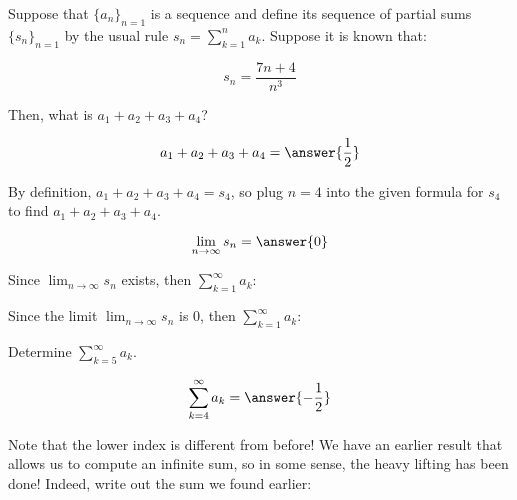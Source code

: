 \documentclass{ximera}
\author{Jim Talamo}
\begin{document}
\begin{exercise}
Suppose that $\{a_n\}_{n=1}$ is a sequence and define its sequence of partial sums $\{s_n\}_{n=1}$ by the usual rule $s_n = \sum_{k=1}^n a_k$.  Suppose it is known that:

\[
s_n = \frac{7n+4}{n^3}
\]

Then, what is $a_1+a_2+a_3+a_4$?

\[
a_1+a_2+a_3+a_4= \answer{\frac{1}{2}}
\]
\begin{hint}
By definition, $a_1+a_2 +a_3+a_4= s_4$, so plug $n=4$ into the given formula for $s_4$ to find $a_1+a_2+a_3+a_4$.
\end{hint}
\begin{exercise}
\[
\lim_{n \to \infty} s_n = \answer{0}
\]

\begin{exercise}
Since $\lim_{n \to \infty} s_n$ exists, then $\sum_{k=1}^{\infty} a_k$:


\begin{multipleChoice}
\end{multipleChoice}

Since the limit $\lim_{n \to \infty} s_n$ is $0$, then $\sum_{k=1}^{\infty} a_k$:
\begin{multipleChoice}
\end{multipleChoice}

\begin{exercise}
Determine $\sum_{k=5}^{\infty} a_k$.

\[
\sum_{k=4}^{\infty} a_k = \answer{-\frac{1}{2}}
\]

\begin{hint}
Note that the lower index is different from before!  We have an earlier result that allows us to compute an infinite sum, so in some sense, the heavy lifting has been done!  Indeed, write out the sum we found earlier:
\begin{image}
  \end{image}
\end{hint}


\end{exercise}
\end{exercise}
\end{exercise}
\end{exercise}
\end{document}
